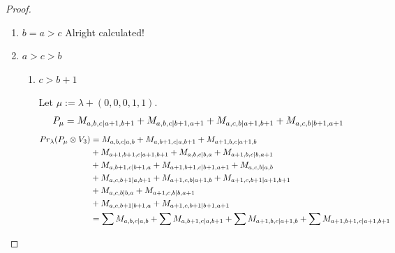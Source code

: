\begin{proof}
\begin{enumerate}
\begin{enumerate}
\begin{table}[htbp]
\begin{tabular}{cc}
\midrule
 $P_{a+1,a+2,c|a+1,a+2}$ & \makecell{
 $M_{a+2,a+2,c|a+2,a+2}$,
 $M_{a+1,a+3,c|a+1,a+3}$,
 $M_{a+3,a+2,c|a+2,a+3}$,
 $M_{a+2,a+1,c|a+1,a+2}$, \\
 $M_{a+3,a+1,c|a+1,a+3}$
}\\
\bottomrule
\end{tabular}
\vspace{0.5em}
\parbox{\linewidth}{\small
\textbf{Interpretation:}
This table displays only selected computational results. This partial presentation does not affect our conclusion.
}
\end{table}
      \end{enumerate}
    \item $b=a>c$ Alright calculated!

    \item $a>c>b$
      \begin{enumerate}
        \item $c>b+1$ \par
        Let $\mu:=\lambda + (0,0,0,1,1) $.
        \begin{equation}\notag
          \begin{aligned}
            P_\mu = M_{a,b,c|a+1,b+1}
+ M_{a,b,c|b+1,a+1}
+ M_{a,c,b|a+1,b+1}
+ M_{a,c,b|b+1,a+1}
          \end{aligned}
        \end{equation}
        \begin{equation}\notag
          \begin{aligned}
            Pr_{\lambda}(P_\mu \otimes V_{3}) &=
M_{a,b,c|a,b}
+ M_{a,b+1,c|a,b+1}
+ M_{a+1,b,c|a+1,b}\\
                                              &
+ M_{a+1,b+1,c|a+1,b+1}
+ M_{a,b,c|b,a}
+ M_{a+1,b,c|b,a+1}\\
                                              &
+ M_{a,b+1,c|b+1,a}
+ M_{a+1,b+1,c|b+1,a+1}
+ M_{a,c,b|a,b}\\
                                              &
+ M_{a,c,b+1|a,b+1}
+ M_{a+1,c,b|a+1,b}
+ M_{a+1,c,b+1|a+1,b+1}\\
                                              &
+ M_{a,c,b|b,a}
+ M_{a+1,c,b|b,a+1}\\
                                              &
+ M_{a,c,b+1|b+1,a}
+ M_{a+1,c,b+1|b+1,a+1} \\
                                               &=
\sum M_{a,b,c|a,b}
+ \sum M_{a,b+1,c|a,b+1}
+ \sum M_{a+1,b,c|a+1,b}
+ \sum M_{a+1,b+1,c|a+1,b+1}
          \end{aligned}

\end{equation}
\end{enumerate}
\end{enumerate}
\end{proof}

